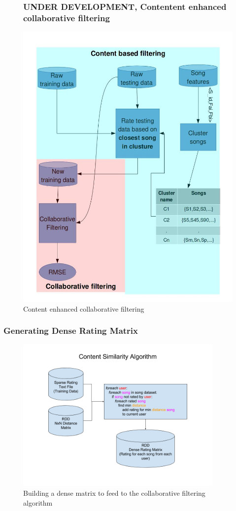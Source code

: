 \documentclass[11pt]{beamer}
\begin{document}
  \begin{frame}
    \begin{figure}[!h]
      \frametitle{{\bf UNDER DEVELOPMENT}, Contentent enhanced collaborative filtering}
      \centering
      \includegraphics[width=0.4\linewidth]{figures/contentBasedBlockDiag.jpg}
      \caption{ Content enhanced collaborative filtering}
    \end{figure}
  \end{frame}
  \begin{frame}
    \frametitle{Generating Dense Rating Matrix}
    \begin{figure}[h]
      \centering
      \includegraphics[width=4in]{figures/content_similarity_algorithm.png}
      \caption{Building a dense matrix to feed to the collaborative filtering algorithm}
      \label{fig:content_similarity_algorithm}
    \end{figure}
  \end{frame}
\end{document}
